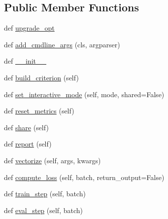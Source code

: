 \subsection*{Public Member Functions}
\begin{DoxyCompactItemize}
\item 
def \hyperlink{classparlai_1_1core_1_1torch__generator__agent_1_1TorchGeneratorAgent_a9b840de6769acee3aac913d25c448a1d}{upgrade\+\_\+opt}
\item 
def \hyperlink{classparlai_1_1core_1_1torch__generator__agent_1_1TorchGeneratorAgent_ad2e2f6361e46785d0b79e4c5031e5710}{add\+\_\+cmdline\+\_\+args} (cls, argparser)
\item 
def \hyperlink{classparlai_1_1core_1_1torch__generator__agent_1_1TorchGeneratorAgent_a994ed6de4104aa3135deed2fcba75520}{\+\_\+\+\_\+init\+\_\+\+\_\+}
\item 
def \hyperlink{classparlai_1_1core_1_1torch__generator__agent_1_1TorchGeneratorAgent_a8f8437dd8d0dc44f941dbc6182121284}{build\+\_\+criterion} (self)
\item 
def \hyperlink{classparlai_1_1core_1_1torch__generator__agent_1_1TorchGeneratorAgent_a8a3c13d2b8988d2a0cbb71f44ae81f52}{set\+\_\+interactive\+\_\+mode} (self, mode, shared=False)
\item 
def \hyperlink{classparlai_1_1core_1_1torch__generator__agent_1_1TorchGeneratorAgent_a7cac9c087d7357d32a7c3bc8fa74930c}{reset\+\_\+metrics} (self)
\item 
def \hyperlink{classparlai_1_1core_1_1torch__generator__agent_1_1TorchGeneratorAgent_ad10e64dd33f1add04ba5bcf36b86c2bf}{share} (self)
\item 
def \hyperlink{classparlai_1_1core_1_1torch__generator__agent_1_1TorchGeneratorAgent_a3ed32722f939a8afd258830b7093fc18}{report} (self)
\item 
def \hyperlink{classparlai_1_1core_1_1torch__generator__agent_1_1TorchGeneratorAgent_a66f36d7201bc1b9a019d3525a5934cf7}{vectorize} (self, args, kwargs)
\item 
def \hyperlink{classparlai_1_1core_1_1torch__generator__agent_1_1TorchGeneratorAgent_a94808a13bba0d5283613acd98516bd3c}{compute\+\_\+loss} (self, batch, return\+\_\+output=False)
\item 
def \hyperlink{classparlai_1_1core_1_1torch__generator__agent_1_1TorchGeneratorAgent_afe2226ddfc838ec27580e3499cc0bae7}{train\+\_\+step} (self, batch)
\item 
def \hyperlink{classparlai_1_1core_1_1torch__generator__agent_1_1TorchGeneratorAgent_ac584268dd08c6fcb0045aa968cad8561}{eval\+\_\+step} (self, batch)
\end{DoxyCompactItemize}
